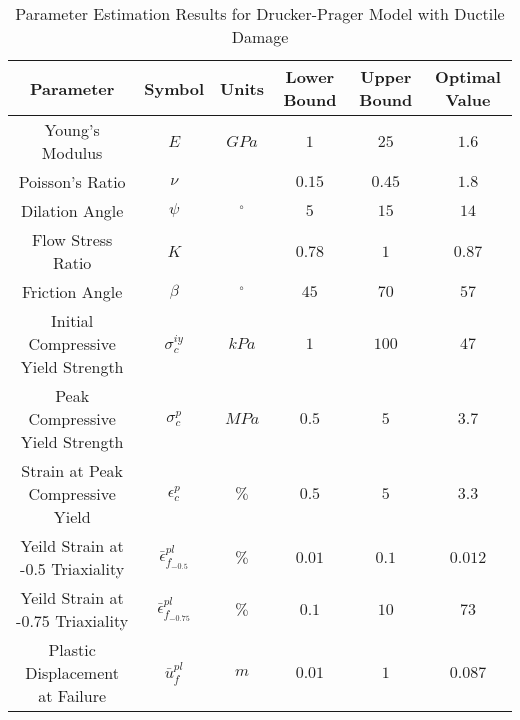 \begin{table}[!htbp]
\centering
\caption{Parameter Estimation Results for Drucker-Prager Model with Ductile Damage}
\label{tab:paramDrucker}
\begin{tabular}{@{}cccccc@{}}
\toprule
Parameter                                  & Symbol                            & Units      & Lower Bound & Upper Bound & Optimal Value \\ \midrule
Young's Modulus                            & $E$                               & $GPa$      & $1$         & $25$        & $1.6$        \\
Poisson's Ratio                            & $\nu$                             &            & $0.15$      & $0.45$      & $1.8$        \\
Dilation Angle                             & $\psi$                            & $^{\circ}$ & $5$         & $15$        & $14$        \\
Flow Stress Ratio                          & $K$                               &            & $0.78$      & $1$         & $0.87$        \\
Friction Angle                             & $\beta$                           & $^{\circ}$ & $45$        & $70$        & $57$        \\
Initial Compressive Yield Strength         & $\sigma_c^{iy}$                   & $kPa$      & $1$         & $100$       & $47$        \\
Peak Compressive Yield Strength  & $\sigma_c^{p}$                    & $MPa$      & $0.5$       & $5$         & $3.7$        \\
Strain at Peak Compressive Yield           & $\epsilon_c^{p}$                 & $\%$       & $0.5$       & $5$         & $3.3$        \\
Yeild Strain at -0.5 Triaxiality           & $\bar{\epsilon}^{pl}_{f_{-0.5}}$  & $\%$       & $0.01$      & $0.1$       & $0.012$       \\
Yeild Strain at -0.75 Triaxiality          & $\bar{\epsilon}^{pl}_{f_{-0.75}}$ & $\%$       & $0.1$       & $10$        & $73$        \\
Plastic Displacement at Failure            & $\bar{u}^{pl}_f$                  & $m$        & $0.01$      & $1$         & $0.087$      \\ \bottomrule
\end{tabular}
\end{table}

